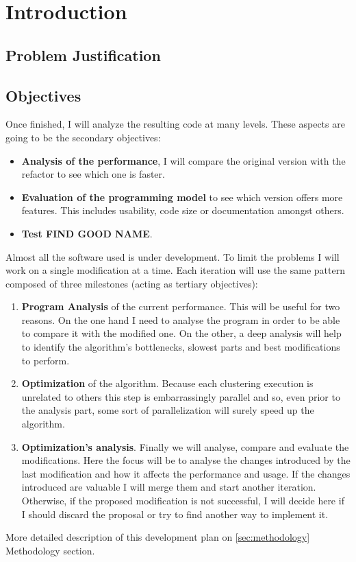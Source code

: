 \chapter{Introduction}

\section{Problem Justification}






\section{Objectives}



Once finished, I will analyze the resulting code at many levels. These aspects are going to be the secondary objectives:

\begin{itemize}
\item \textbf{Analysis of the performance}, I will compare the original version with the refactor to see which one is faster.
\item \textbf{Evaluation of the programming model} to see which version offers more features. This includes usability, code size or documentation amongst others.
\item \textbf{Test FIND GOOD NAME}. 
\end{itemize}


Almost all the software used is under development. To limit the problems I will work on a single modification at a time. Each iteration will use the same pattern composed of three milestones (acting as tertiary objectives):  
\begin{enumerate}
\item \textbf{Program Analysis} of the current performance. This will be useful for two reasons. On the one hand I need to analyse the program in order to be able to compare it with the modified one. On the other, a deep analysis will help to identify the algorithm's bottlenecks, slowest parts and best modifications to perform.
\item \textbf{Optimization} of the algorithm. Because each clustering execution is unrelated to others this step is embarrassingly parallel and so, even prior to the analysis part, some sort of parallelization will surely speed up the algorithm. 
\item \textbf{Optimization's analysis}. Finally we will analyse, compare and evaluate the modifications. Here the focus will be to analyse the changes introduced by the last modification and how it affects the performance and usage. If the changes introduced are valuable I will merge them and start another iteration. Otherwise, if the proposed modification is not successful, I will decide here if I should discard the proposal or try to find another way to implement it.
\end{enumerate}

More detailed description of this development plan on \ref{sec:methodology} Methodology section.

